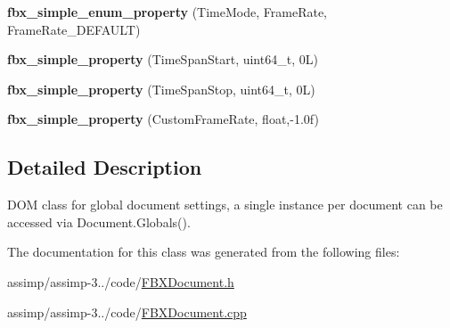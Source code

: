 \begin{DoxyCompactItemize}
\item 
\hypertarget{class_assimp_1_1_f_b_x_1_1_file_global_settings_a7e87325e49f0d0aea4a8d7040bf31600}{{\bfseries fbx\+\_\+simple\+\_\+enum\+\_\+property} (Time\+Mode, Frame\+Rate, Frame\+Rate\+\_\+\+D\+E\+F\+A\+U\+L\+T)}\label{class_assimp_1_1_f_b_x_1_1_file_global_settings_a7e87325e49f0d0aea4a8d7040bf31600}

\item 
\hypertarget{class_assimp_1_1_f_b_x_1_1_file_global_settings_a9ad53059531e7a0e1a79b497a943f337}{{\bfseries fbx\+\_\+simple\+\_\+property} (Time\+Span\+Start, uint64\+\_\+t, 0\+L)}\label{class_assimp_1_1_f_b_x_1_1_file_global_settings_a9ad53059531e7a0e1a79b497a943f337}

\item 
\hypertarget{class_assimp_1_1_f_b_x_1_1_file_global_settings_acc359a3370ef605df5516325c5d55558}{{\bfseries fbx\+\_\+simple\+\_\+property} (Time\+Span\+Stop, uint64\+\_\+t, 0\+L)}\label{class_assimp_1_1_f_b_x_1_1_file_global_settings_acc359a3370ef605df5516325c5d55558}

\item 
\hypertarget{class_assimp_1_1_f_b_x_1_1_file_global_settings_a5594ea8f6d07117804e78027c6f58036}{{\bfseries fbx\+\_\+simple\+\_\+property} (Custom\+Frame\+Rate, float,-\/1.\+0f)}\label{class_assimp_1_1_f_b_x_1_1_file_global_settings_a5594ea8f6d07117804e78027c6f58036}

\end{DoxyCompactItemize}


\subsection{Detailed Description}
D\+O\+M class for global document settings, a single instance per document can be accessed via Document.\+Globals(). 

The documentation for this class was generated from the following files\+:\begin{DoxyCompactItemize}
\item 
assimp/assimp-\/3../code/\hyperlink{_f_b_x_document_8h}{F\+B\+X\+Document.\+h}\item 
assimp/assimp-\/3../code/\hyperlink{_f_b_x_document_8cpp}{F\+B\+X\+Document.\+cpp}\end{DoxyCompactItemize}
